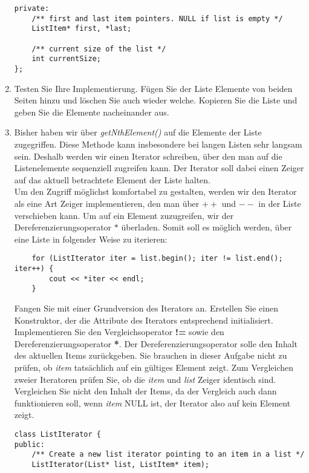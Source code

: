 \documentclass[
  accentcolor=tud1c,	%
  colorbacktitle,		%
  inverttitle,			%
  german,				%
  twoside
]{tudexercise}
\begin{document}
\begin{enumerate}
\begin{lstlisting}
private:
	/** first and last item pointers. NULL if list is empty */
	ListItem* first, *last;
	
	/** current size of the list */
	int currentSize;
};
\end{lstlisting}

\item Testen Sie Ihre Implementierung. Fügen Sie der Liste Elemente von beiden Seiten hinzu und löschen Sie auch wieder welche. Kopieren Sie die Liste und geben Sie die Elemente nacheinander aus.

\item Bisher haben wir über \emph{getNthElement()} auf die Elemente der Liste zugegriffen. Diese Methode kann insbesondere bei langen Listen sehr langsam sein. Deshalb werden wir einen Iterator schreiben, über den man auf die Listenelemente sequenziell zugreifen kann. Der Iterator soll dabei einen Zeiger auf das aktuell betrachtete Element der Liste halten. \\

Um den Zugriff möglichst komfortabel zu gestalten, werden wir den Iterator als eine Art Zeiger implementieren, den man über \textbf{$++$} und \textbf{$--$} in der Liste verschieben kann. Um auf ein Element zuzugreifen, wir der Dereferenzierungsoperator $*$ überladen. Somit soll es möglich werden, über eine Liste in folgender Weise zu iterieren: \\
\begin{lstlisting}
	for (ListIterator iter = list.begin(); iter != list.end(); iter++) {
		cout << *iter << endl;
	}
\end{lstlisting}

Fangen Sie mit einer Grundversion des Iterators an. Erstellen Sie einen Konstruktor, der die Attribute des Iterators entsprechend initialisiert.
Implementieren Sie den Vergleichsoperator \textbf{!=} sowie den Dereferenzierungsoperator \textbf{*}. Der Dereferenzierungsoperator solle den Inhalt des aktuellen Items zurückgeben. Sie brauchen in dieser Aufgabe nicht zu prüfen, ob \emph{item} tatsächlich auf ein gültiges Element zeigt. Zum Vergleichen zweier Iteratoren prüfen Sie, ob die \emph{item} und \emph{list} Zeiger identisch sind. Vergleichen Sie nicht den Inhalt der Items, da der Vergleich auch dann funktionieren soll, wenn \emph{item} NULL ist, der Iterator also auf kein Element zeigt.  \\

\begin{lstlisting}
class ListIterator {
public:
	/** Create a new list iterator pointing to an item in a list */
	ListIterator(List* list, ListItem* item);


\end{lstlisting}
\end{enumerate}
\end{document}
